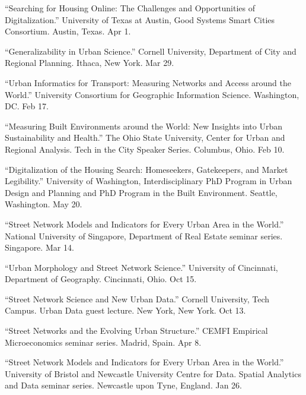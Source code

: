 \documentclass[11pt,letterpaper]{report} %
\begin{document}
\begin{tablist}
\item[2024] \tab{}\enquote{Searching for Housing Online: The Challenges and Opportunities of Digitalization.} University of Texas at Austin, Good Systems Smart Cities Consortium. Austin, Texas. Apr 1.

\item[2024] \tab{}\enquote{Generalizability in Urban Science.} Cornell University, Department of City and Regional Planning. Ithaca, New York. Mar 29.

\item[2023] \tab{}\enquote{Urban Informatics for Transport: Measuring Networks and Access around the World.} University Consortium for Geographic Information Science. Washington, DC\@. Feb 17.

\item[2023] \tab{}\enquote{Measuring Built Environments around the World: New Insights into Urban Sustainability and Health.} The Ohio State University, Center for Urban and Regional Analysis. Tech in the City Speaker Series. Columbus, Ohio. Feb 10.

\item[2022] \tab{}\enquote{Digitalization of the Housing Search: Homeseekers, Gatekeepers, and Market Legibility.} University of Washington, Interdisciplinary PhD Program in Urban Design and Planning and PhD Program in the Built Environment. Seattle, Washington. May 20.

\item[2022] \tab{}\enquote{Street Network Models and Indicators for Every Urban Area in the World.} National University of Singapore, Department of Real Estate seminar series. Singapore. Mar 14.

\item[2021] \tab{}\enquote{Urban Morphology and Street Network Science.} University of Cincinnati, Department of Geography. Cincinnati, Ohio. Oct 15.

\item[2021] \tab{}\enquote{Street Network Science and New Urban Data.} Cornell University, Tech Campus. Urban Data guest lecture. New York, New York. Oct 13.

\item[2021] \tab{}\enquote{Street Networks and the Evolving Urban Structure.} CEMFI Empirical Microeconomics seminar series. Madrid, Spain. Apr 8.

\item[2021] \tab{}\enquote{Street Network Models and Indicators for Every Urban Area in the World.} University of Bristol and Newcastle University Centre for Data. Spatial Analytics and Data seminar series. Newcastle upon Tyne, England. Jan 26.


\end{tablist}
\end{document}
